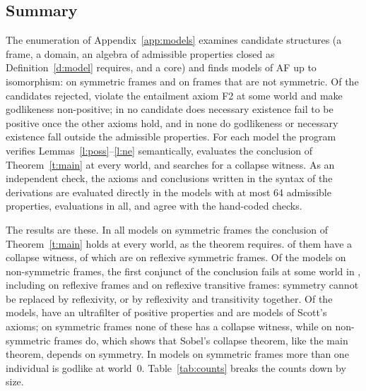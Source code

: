 \documentclass{situationist-preprint}
\begin{document}
\subsection{Summary}

The enumeration of Appendix~\ref{app:models} examines \csCandidates{} candidate structures (a frame, a domain, an algebra of admissible properties closed as Definition~\ref{d:model} requires, and a core) and finds \csModels{} models of AF up to isomorphism: \csSym{} on symmetric frames and \csNon{} on frames that are not symmetric. Of the candidates rejected, \csRejFTwo{} violate the entailment axiom F2 at some world and \csRejAThree{} make godlikeness non-positive; in no candidate does necessary existence fail to be positive once the other axioms hold, and in none do godlikeness or necessary existence fall outside the admissible properties. For each model the program verifies Lemmas~\ref{l:poss}--\ref{l:ne} semantically, evaluates the conclusion of Theorem~\ref{t:main} at every world, and searches for a collapse witness. As an independent check, the axioms and conclusions written in the syntax of the derivations are evaluated directly in the \csXModels{} models with at most 64 admissible properties, \csXFormulas{} evaluations in all, and agree with the hand-coded checks.

The results are these. In all \csSym{} models on symmetric frames the conclusion of Theorem~\ref{t:main} holds at every world, as the theorem requires. \csSymColl{} of them have a collapse witness, \csSymTColl{} of which are on reflexive symmetric frames. Of the \csNon{} models on non-symmetric frames, the first conjunct of the conclusion fails at some world in \csNonFail{}, including \csNonFailT{} on reflexive frames and \csNonFailTFour{} on reflexive transitive frames: symmetry cannot be replaced by reflexivity, or by reflexivity and transitivity together. Of the \csModels{} models, \csScottModels{} have an ultrafilter of positive properties and are models of Scott's axioms; on symmetric frames none of these has a collapse witness, while on non-symmetric frames \csScottNonColl{} do, which shows that Sobel's collapse theorem, like the main theorem, depends on symmetry. In \csManyGods{} models on symmetric frames more than one individual is godlike at world~0. Table~\ref{tab:counts} breaks the counts down by size.

\begin{table}[ht]
\caption{Models of AF by number of worlds $n$ and individuals $m$. Scope \enquote{all}: every frame; \enquote{B}: symmetric frames only; \enquote{B or T}: symmetric or reflexive frames. \enquote{Collapse fails}: models with a collapse witness.}\label{tab:counts}

\end{table}
\end{document}
